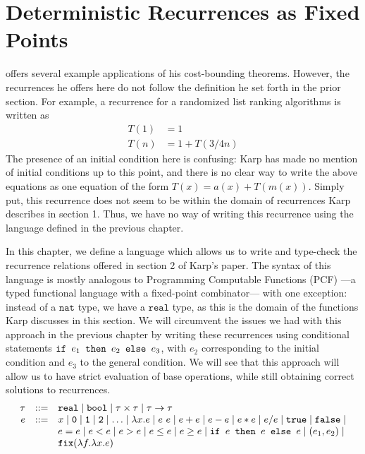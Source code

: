 \chapter{Deterministic Recurrences as Fixed Points}
\cite[\S2]{Karp} offers several example applications of his cost-bounding theorems. However, the recurrences
he offers here do not follow the definition he set forth in the prior section. For example, a recurrence for a randomized list 
ranking algorithms is written as
\begin{align*}
T(1) &= 1 \\
T(n) &= 1 + T(3/4n)
\end{align*}
The presence of an initial condition here is confusing: Karp has made no mention of initial conditions up to this point, and 
there is no clear way to write the above equations as one equation of the form $T(x) = a(x) + T(m(x))$. Simply put, 
this recurrence does not seem to be within the domain of recurrences Karp describes in section 1. Thus, we have no way
of writing this recurrence using the language defined in the previous chapter. 

In this chapter, we define a language which allows us to write and type-check the recurrence relations offered in section 2 of Karp's paper. The syntax of this language is mostly analogous to Programming Computable Functions (PCF) ---a typed functional language with a fixed-point combinator--- with one exception: instead of a 
$\texttt{nat}$ type, we have a $\texttt{real}$ type, as this is the domain of the functions Karp discusses in this section. 
We will circumvent the issues we had with this approach in the previous chapter by writing these recurrences
using conditional statements $\texttt{if } e_1 \texttt{ then } e_2 \texttt{ else } e_3$, with $e_2$ corresponding to the initial condition and $e_3$
to the general condition. We will see that this approach will allow us to have strict evaluation of base operations, while
still obtaining correct solutions to recurrences.
\[
\begin{array}{rcl}
\tau &::=& \texttt{real} \mid \texttt{bool} \mid \tau \times \tau \mid \tau \rightarrow \tau \\
e &::=& x  \mid \texttt{0} \mid \texttt{1} \mid \texttt{2} \mid \dotsc \mid \lambda x.e \mid e \ e \mid e + e \mid e - e \mid  e  *  e 
\mid e / e \mid \texttt{true} \mid \texttt{false} \mid \\
  && e  =  e \mid e < e \mid e > e \mid e \leq e \mid e \geq e \mid 
     \texttt{if } e \texttt{ then } e \texttt{ else } e \mid (e_1, e_2) \mid \\
     && \texttt{fix} (\lambda f.\lambda x.e) 
\end{array}
\]

